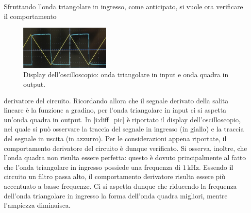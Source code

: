 \documentclass[a4paper,11pt]{article} %
\begin{document}
Sfruttando l'onda triangolare in ingresso, come anticipato, si vuole ora verificare il comportamento 

\begin{figure}
	\centering
	\includegraphics[width=0.4\textwidth]{../Plots/Report_Plots/diff_osc_pic.png}
	\caption{\small Display dell'oscilloscopio: onda triangolare in input e onda quadra in output.}
	\label{i:diff_pic}
\end{figure}

\noindent derivatore del circuito. Ricordando allora che il segnale derivato della salita lineare è la funzione a
gradino, per l'onda triangolare in input ci si aspetta un'onda quadra in output. In \autoref{i:diff_pic} è riportato il
display dell'oscilloscopio, nel quale si può osservare la traccia del segnale in ingresso (in giallo) e la traccia del
segnale in uscita (in azzurro). Per le considerazioni appena riportate, il comportamento derivatore del circuito è
dunque verificato. Si osserva, inoltre, che l'onda quadra non risulta essere perfetta: questo è dovuto principalmente al
fatto che l'onda triangolare in ingresso possiede una frequenza di $1\,\si{\kHz}$. Essendo il circuito un filtro passa
alto, il comportamento derivatore risulta essere più accentuato a basse frequenze. Ci si aspetta dunque che riducendo la
frequenza dell'onda triangolare in ingresso la forma dell'onda quadra migliori, mentre l'ampiezza diminuisca.


\end{document}
